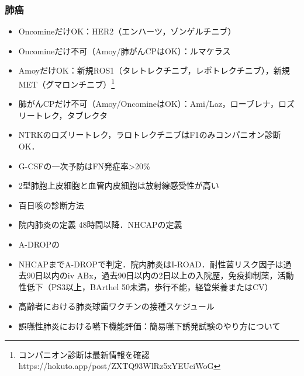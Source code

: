 \subsubsection{肺癌}
\begin{itemize}
\item OncomineだけOK：HER2（エンハーツ，ゾンゲルチニブ）
\item Oncomineだけ不可（Amoy/肺がんCPはOK）：ルマケラス
\item AmoyだけOK：新規ROS1（タレトレクチニブ，レポトレクチニブ），新規MET（グマロンチニブ）\footnote{コンパニオン診断は最新情報を確認 https://hokuto.app/post/ZXTQ93WlRz5xYEUeiWoG}
\item 肺がんCPだけ不可（Amoy/OncomineはOK）：Ami/Laz，ローブレナ，ロズリートレク，タブレクタ
\item NTRKのロズリートレク，ラロトレクチニブはF1のみコンパニオン診断OK．


\item G-CSFの一次予防はFN発症率>20\% 

\item 2型肺胞上皮細胞と血管内皮細胞は放射線感受性が高い
\item 百日咳の診断方法
\item 院内肺炎の定義 48時間以降．NHCAPの定義
\item A-DROPの
\item NHCAPまでA-DROPで判定．院内肺炎はI-ROAD．耐性菌リスク因子は過去90日以内のiv ABx，過去90日以内の2日以上の入院歴，免疫抑制薬，活動性低下（PS3以上，BArthel 50未満，歩行不能，経管栄養またはCV）
\item 高齢者における肺炎球菌ワクチンの接種スケジュール
\item 誤嚥性肺炎における嚥下機能評価：簡易嚥下誘発試験のやり方について
\end{itemize}

